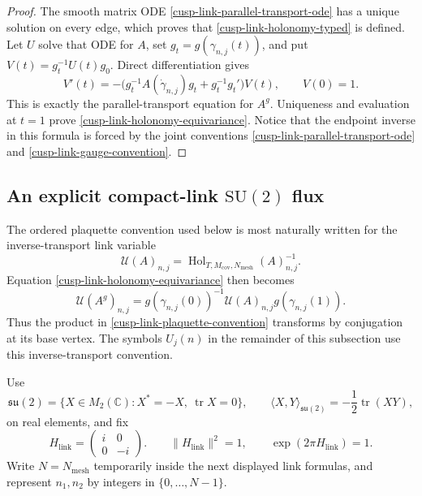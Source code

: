 \begin{proof}
The smooth matrix ODE \eqref{cusp-link-parallel-transport-ode} has a unique
solution on every edge, which proves that \eqref{cusp-link-holonomy-typed}
is defined.  Let \(U\) solve that ODE for \(A\), set
\(g_t=g(\gamma_{n,j}(t))\), and put
\(V(t)=g_t^{-1}U(t)g_0\).  Direct differentiation gives
\[
 V'(t)=-\bigl(g_t^{-1}A(\dot\gamma_{n,j})g_t
                 +g_t^{-1}g_t'\bigr)V(t),
 \qquad V(0)=1.
\]
This is exactly the parallel-transport equation for \(A^g\).  Uniqueness
and evaluation at \(t=1\) prove \eqref{cusp-link-holonomy-equivariance}.
Notice that the endpoint inverse in this formula is forced by the joint
conventions \eqref{cusp-link-parallel-transport-ode} and
\eqref{cusp-link-gauge-convention}.
\end{proof}

\subsection{An explicit compact-link
\texorpdfstring{\(\mathrm{SU}(2)\)}{SU(2)} flux}

The ordered plaquette convention used below is most naturally written for
the inverse-transport link variable
\begin{equation}
 \mathcal U(A)_{n,j}
 =\operatorname{Hol}_{T,M_{\mathrm{cov}},N_{\mathrm{mesh}}}(A)_{n,j}^{-1}.
 \label{cusp-link-inverse-transport-variable}
\end{equation}
Equation \eqref{cusp-link-holonomy-equivariance} then becomes
\begin{equation}
 \mathcal U(A^g)_{n,j}
 =g(\gamma_{n,j}(0))^{-1}\mathcal U(A)_{n,j}g(\gamma_{n,j}(1)).
 \label{cusp-link-inverse-transport-gauge-law}
\end{equation}
Thus the product in \eqref{cusp-link-plaquette-convention} transforms by
conjugation at its base vertex.  The symbols \(U_j(n)\) in the remainder of
this subsection use this inverse-transport convention.

Use
\begin{equation}
 \mathfrak{su}(2)=\{X\in M_2(\mathbb C):X^*=-X,\ \operatorname{tr}X=0\},
 \qquad
 \langle X,Y\rangle_{\mathfrak{su}(2)}
 =-\frac12\operatorname{tr}(XY),
 \label{cusp-link-su2-inner-product}
\end{equation}
on real elements, and fix
\begin{equation}
 H_{\mathrm{link}}=\begin{pmatrix}i&0\\0&-i\end{pmatrix}.
 \qquad
 \lVert H_{\mathrm{link}}\rVert^2=1,
 \qquad \exp(2\pi H_{\mathrm{link}})=1.
 \label{cusp-link-flux-generator}
\end{equation}
Write \(N=N_{\mathrm{mesh}}\) temporarily inside the next displayed link
formulas, and represent \(n_1,n_2\) by integers in
\(\{0,\ldots,N-1\}\).

